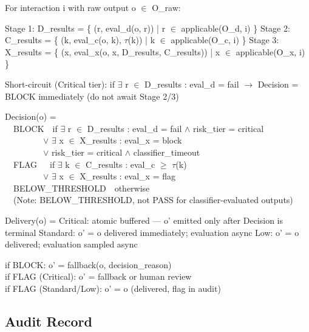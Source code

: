 \begin{cdef}
For interaction i with raw output o $\in$ O\_\allowbreak{}raw:

Stage 1: D\_\allowbreak{}results = \{ (r, eval\_\allowbreak{}d(o, r)) | r $\in$ applicable(O\_\allowbreak{}d, i) \} Stage 2: C\_\allowbreak{}results = \{ (k, eval\_\allowbreak{}c(o, k), $\tau$(k)) | k $\in$ applicable(O\_\allowbreak{}c, i) \} Stage 3: X\_\allowbreak{}results = \{ (x, eval\_\allowbreak{}x(o, x, D\_\allowbreak{}results, C\_\allowbreak{}results)) | x $\in$ applicable(O\_\allowbreak{}x, i) \}

Short-circuit (Critical tier): if $\exists$ r $\in$ D\_\allowbreak{}results : eval\_\allowbreak{}d = fail $\to$ Decision = BLOCK immediately (do not await Stage 2/3)

\begin{claddisp}
Decision(o) =\\
~~BLOCK~~if $\exists$ r $\in$ D\_results : eval\_d = fail $\wedge$ risk\_tier = critical\\
~~~~~~~~~$\vee$ $\exists$ x $\in$ X\_results : eval\_x = block\\
~~~~~~~~~$\vee$ risk\_tier = critical $\wedge$ classifier\_timeout\\
~~FLAG~~~if $\exists$ k $\in$ C\_results : eval\_c $\geq$ $\tau$(k)\\
~~~~~~~~~$\vee$ $\exists$ x $\in$ X\_results : eval\_x = flag\\
~~BELOW\_THRESHOLD~~otherwise\\
~~(Note: BELOW\_THRESHOLD, not PASS \textemdash{} for classifier-evaluated outputs)\\
\end{claddisp}
Delivery(o) = Critical: atomic buffered --- o' emitted only after Decision is terminal Standard: o' = o delivered immediately; evaluation async Low: o' = o delivered; evaluation sampled async

\begin{claddisp}
if BLOCK: o' = fallback(o, decision\_reason)\\
if FLAG (Critical): o' = fallback or human review\\
if FLAG (Standard/Low): o' = o (delivered, flag in audit)\\
\end{claddisp}
\end{cdef}


\subsection{Audit Record}
\label{sec:formal-model-A-2-4}


